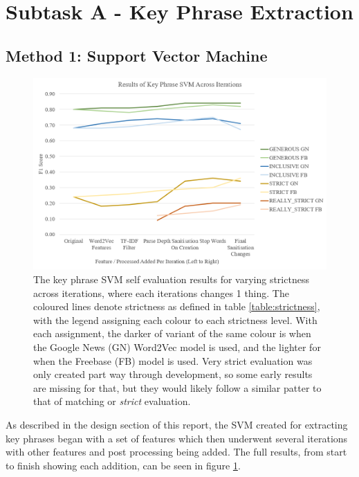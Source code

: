 \section{Subtask A - Key Phrase Extraction}

\subsection{Method 1: Support Vector Machine}

\begin{figure}[t]
	\includegraphics[width=\textwidth]{img/kpsvmresults.png}
	\caption[Key Phrase SVM Self Evaluation Through Iterations]{The key phrase SVM self evaluation results for varying strictness across iterations, where each iterations changes 1 thing. The coloured lines denote strictness as defined in table \ref{table:strictness}, with the legend assigning each colour to each strictness level. With each assignment, the darker of variant of the same colour is when the Google News (GN) Word2Vec model is used, and the lighter for when the Freebase (FB) model is used. Very strict evaluation was only created part way through development, so some early results are missing for that, but they would likely follow a similar patter to that of matching or \textit{strict} evaluation.}
	\label{figure:kpsvmresults}
\end{figure}

As described in the design section of this report, the SVM created for extracting key phrases began with a set of features which then underwent several iterations with other features and post processing being added. The full results, from start to finish showing each addition, can be seen in figure \ref{figure:kpsvmresults}.

